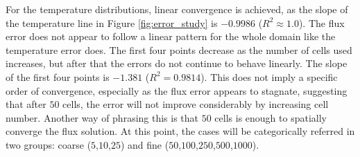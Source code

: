 \documentclass[letterpaper]{mc2023}
\begin{document}
For the temperature distributions, linear convergence is achieved, as the slope of the temperature line in Figure \ref{fig:error_study} is
$-0.9986$ ($R^2\approx1.0$). The flux error does not appear to follow a linear pattern for the whole domain like the temperature error does.
The first four points decrease as the number of cells used increases, but after that the errors do not continue to behave linearly. The slope
of the first four points is $-1.381$ ($R^2=0.9814$). This does not imply a specific order of convergence, especially as the flux error appears
to stagnate, suggesting that after $50$ cells, the error will not improve considerably by increasing cell number. Another way of phrasing this
is that $50$ cells is enough to spatially converge the flux solution. At this point, the cases will be categorically referred in two groups:
coarse ($5$,$10$,$25$) and fine ($50$,$100$,$250$,$500$,$1000$).
\end{document}
